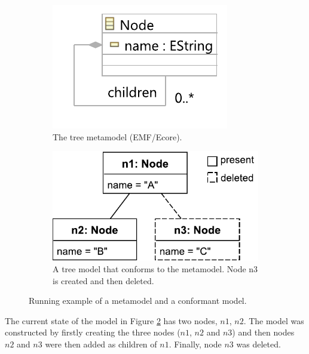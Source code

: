 \documentclass{llncs}
\begin{document}
    \vspace{-20pt}
    \begin{figure}[ht]
        \begin{subfigure}[t]{0.3\linewidth}
            \centering
            \includegraphics[width=0.8\linewidth]{node_metamodel}
            \caption{The tree metamodel (EMF/Ecore).}
            \label{fig:tree_metamodel}
        \end{subfigure}
        \hfill
        \begin{subfigure}[t]{0.7\linewidth}
            \centering
            \includegraphics[width=0.6\linewidth]{initial_chart}
            \caption{A tree model that conforms to the  metamodel.  Node n3 is created and then deleted.}
            \label{fig:initial_model}
        \end{subfigure}
        \caption{Running example of a metamodel and a conformant model.}
        \label{fig:append_speed}
    \end{figure}

\vspace{-10pt}
    The current state of the model in Figure \ref{fig:initial_model} has two nodes, $n1$, $n2$.  The model was constructed by firstly creating the three nodes ($n1$, $n2$ and $n3$) and then nodes $n2$ and $n3$ were then added as children of $n1$. Finally, node $n3$ was deleted.
    
\end{document}
